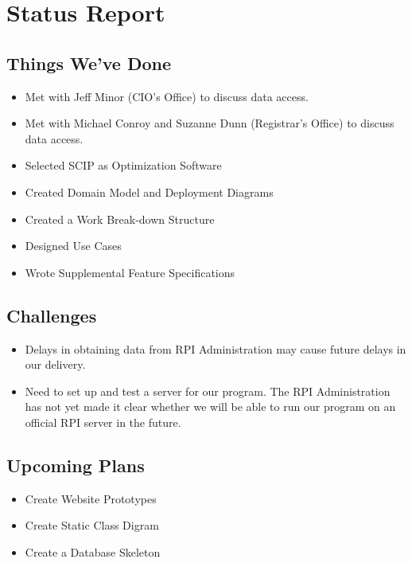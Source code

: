 \documentclass[11pt]{article}
\begin{document}
\section{Status Report} 

\subsection{Things We've Done}
\begin{itemize}
\item Met with Jeff Minor (CIO's Office) to discuss data access.
\item Met with Michael Conroy and Suzanne Dunn (Registrar's Office) to discuss data access.
\item Selected SCIP as Optimization Software
\item Created Domain Model and Deployment Diagrams
\item Created a Work Break-down Structure
\item Designed Use Cases
\item Wrote Supplemental Feature Specifications

\end{itemize}

\subsection{Challenges}
\begin{itemize}
\item Delays in obtaining data from RPI Administration may cause future delays in our delivery.
\item Need to set up and test a server for our program. The RPI Administration has not yet made it clear whether we will be able to run our program on an official RPI server in the future. 
\end{itemize}

\subsection{Upcoming Plans}
\begin{itemize}
\item Create Website Prototypes
\item Create Static Class Digram
\item Create a Database Skeleton
\end{itemize}
\end{document}
